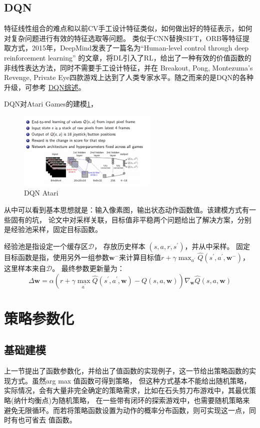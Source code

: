 \documentclass[UTF8]{ctexart}
\begin{document}
\subsection{DQN}
特征线性组合的难点和以前CV手工设计特征类似，如何做出好的特征表示，如何对复杂问题进行有效的特征选取等问题。
类似于CNN替换SIFT，ORB等特征提取方式，2015年，DeepMind发表了一篇名为“Human-level control through deep reinforcement learning”
的文章，将DL引入了RL，给出了一种有效的价值函数的非线性表达方法，同时不需要手工设计特征，并在
Breakout, Pong, Montezuma’s Revenge, Private Eye四款游戏上达到了人类专家水平。随之而来的是DQN的各种升级，可参考
\href{https://deepmind.com/blog/article/Agent57-Outperforming-the-human-Atari-benchmark}{DQN综述}。

DQN对Atari Games的建模\ref{DQN:Atari}，
\begin{figure}[htbp]
	\centering
	\includegraphics[width=6.7cm, height=3.7cm]{./pic/DQN_Atari.png}
    \caption{DQN Atari}
    \label{DQN:Atari}
\end{figure}
从中可以看到基本思想就是：输入像素图，输出状态动作函数值。该建模方式有一些固有的坑，
论文中对采样关联，目标值非平稳两个问题给出了解决方案，分别是经验池采样，固定目标函数。

经验池是指设定一个缓存区$\mathcal{D}$， 存放历史样本
$\left(s, a, r, s^{\prime}\right)$，并从中采样。
固定目标函数是指，使用另外一组参数$\mathbf{w}^{-}$来计算目标值$r+\gamma \max _{a^{\prime}} \hat{Q}(s^{\prime}, a^{\prime}, \mathbf{w}^{-})$，
这里样本来自$\mathcal{D}$。
最终参数更新量为：
\begin{equation}
    \Delta \mathbf{w}=\alpha\left(r+\gamma \max _{a^{\prime}} \hat{Q}\left(s^{\prime}, a^{\prime}, \mathbf{w}\right)-
Q(s, a, \mathbf{w})\right) \nabla_{\mathbf{w}} \hat{Q}(s, a, \mathbf{w})
\end{equation}

\section{策略参数化}
\subsection{基础建模}
\label{sec:PGD}
上一节提出了函数参数化，并给出了值函数的实现例子，这一节给出策略函数的实现方式。虽然arg max 值函数可得到策略，
但这种方式基本不能给出随机策略，实际情况，会有大量非完全确定的策略需求，比如在石头剪刀布游戏中，其最优策略(纳什均衡点)为随机策略，
在一些带有闭环的探索游戏中，也需要随机策略来避免无限循环。而若将策略函数设置为动作的概率分布函数，则可实现这一点，同时有也可省去
值函数。
\end{document}
